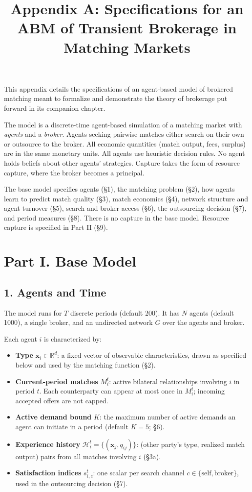 \documentclass[11pt]{article}
\title{Appendix A: Specifications for an ABM of Transient Brokerage in Matching Markets}
\author{}
\date{}
\providecommand{\tightlist}{%
  \setlength{\itemsep}{0pt}\setlength{\parskip}{0pt}}
\begin{document}
\maketitle

This appendix details the specifications of an agent-based model of brokered matching meant to formalize and demonstrate the theory of brokerage put forward in its companion chapter.

The model is a discrete-time agent-based simulation of a matching market with \emph{agents} and a \emph{broker}. Agents seeking pairwise matches either search on their own or outsource to the broker. All economic quantities (match output, fees, surplus) are in the same monetary units. All agents use heuristic decision rules. No agent holds beliefs about other agents' strategies. Capture takes the form of resource capture, where the broker becomes a principal.

The base model specifies agents (§1), the matching problem (§2), how agents learn to predict match quality (§3), match economics (§4), network structure and agent turnover (§5), search and broker access (§6), the outsourcing decision (§7), and period measures (§8). There is no capture in the base model. Resource capture is specified in Part II (§9).

\section{Part I. Base Model}\label{part-i.-base-model}

\subsection{1. Agents and Time}\label{agents-and-time}

The model runs for \(T\) discrete periods (default 200). It has \(N\) agents (default 1000), a single broker, and an undirected network \(G\) over the agents and broker.

Each agent \(i\) is characterized by:

\begin{itemize}
\tightlist
\item
  \textbf{Type} \(\mathbf{x}_i \in \mathbb{R}^d\): a fixed vector of observable characteristics, drawn as specified below and used by the matching function (§2).
\item
  \textbf{Current-period matches} \(M_i^t\): active bilateral relationships involving \(i\) in period \(t\). Each counterparty can appear at most once in \(M_i^t\); incoming accepted offers are not capped.
\item
  \textbf{Active demand bound} \(K\): the maximum number of active demands an agent can initiate in a period (default \(K = 5\); §6).
\item
  \textbf{Experience history} \(\mathcal{H}_{i}^t = \{(\mathbf{x}_j, q_{ij})\}\): (other party's type, realized match output) pairs from all matches involving \(i\) (§3a).
\item
  \textbf{Satisfaction indices} \(s_{i,c}^t\): one scalar per search channel \(c \in \{\text{self}, \text{broker}\}\), used in the outsourcing decision (§7).
\end{itemize}
\end{document}
